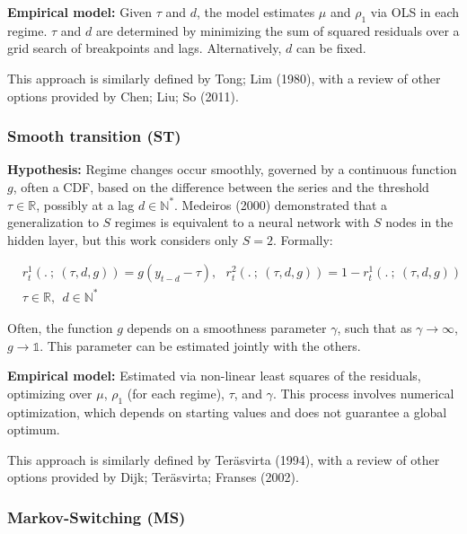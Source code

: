 \documentclass[
  letterpaper,
  DIV=11,
  numbers=noendperiod]{scrartcl}
\numberwithin{equation}{section}
\numberwithin{table}{section}
\numberwithin{figure}{section}
\begin{document}
\textbf{Empirical model:} Given \(\tau\) and \(d\), the model estimates
\(\mu\) and \(\rho_1\) via OLS in each regime. \(\tau\) and \(d\) are
determined by minimizing the sum of squared residuals over a grid search
of breakpoints and lags. Alternatively, \(d\) can be fixed.

This approach is similarly defined by Tong; Lim (1980), with a review of
other options provided by Chen; Liu; So (2011).

\subsubsection{Smooth transition (ST)}\label{smooth-transition-st}

\textbf{Hypothesis:} Regime changes occur smoothly, governed by a
continuous function \(g\), often a CDF, based on the difference between
the series and the threshold \(\tau \in \mathbb{R}\), possibly at a lag
\(d \in \mathbb{N}^*\). Medeiros (2000) demonstrated that a
generalization to \(S\) regimes is equivalent to a neural network with
\(S\) nodes in the hidden layer, but this work considers only \(S = 2\).
Formally:

\begin{equation}
\begin{array}{ll}
    &r^1_t(. ~;~ (\tau, d, g)) = g(y_{t - d} - \tau), ~~~ r^2_t(. ~;~ (\tau, d, g)) = 1 - r^1_t(. ~;~ (\tau, d, g))\\
    &\tau \in \mathbb{R}, ~~ d \in \mathbb{N}^*
\end{array}
\end{equation}

Often, the function \(g\) depends on a smoothness parameter \(\gamma\),
such that as \(\gamma \to \infty\), \(g \to \mathbb{1}\). This parameter
can be estimated jointly with the others.

\textbf{Empirical model:} Estimated via non-linear least squares of the
residuals, optimizing over \(\mu\), \(\rho_1\) (for each regime),
\(\tau\), and \(\gamma\). This process involves numerical optimization,
which depends on starting values and does not guarantee a global
optimum.

This approach is similarly defined by Teräsvirta (1994), with a review
of other options provided by Dijk; Teräsvirta; Franses (2002).

\subsubsection{Markov-Switching (MS)}\label{markov-switching-ms}
\end{document}
